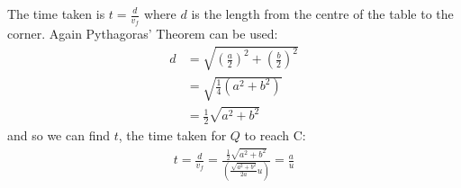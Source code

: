 \begin{hint}
{\begin{enumerate}
The time taken is $t = \frac{d}{v_{f}}$ where $d$ is the length from the centre of the table to the corner. Again Pythagoras' Theorem can be used:
\begin{align*} d &= \sqrt{ \left(\frac{a}{2}\right)^{2} + \left(\frac{b}{2}\right)^{2} } \\ &= \sqrt{\frac{1}{4}(a^{2} + b^{2})} \\ &= \frac{1}{2}\sqrt{a^{2} + b^{2}} \end{align*}
and so we can find $t$, the time taken for $Q$ to reach C:
\begin{align*} t = \frac{d}{v_{f}} = \frac{\frac{1}{2}\sqrt{a^{2} + b^{2}}}{\left(\frac{\sqrt{a^{2} + b^{2}}}{2a} u\right)} = \frac{a}{u} \end{align*}

\end{enumerate}
}
\end{hint}